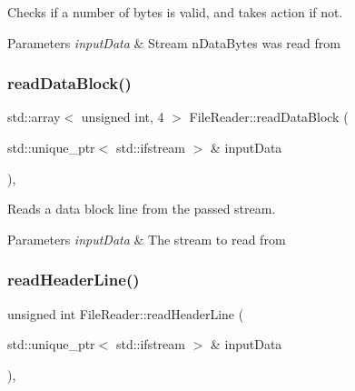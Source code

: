 Checks if a number of bytes is valid, and takes action if not. 


\begin{DoxyParams}{Parameters}
{\em input\+Data} & Stream n\+Data\+Bytes was read from \\
\hline
\end{DoxyParams}
\mbox{\label{class_file_reader_ac578b683eba751027766a2c30f03a28b}} 
\subsubsection{\texorpdfstring{read\+Data\+Block()}{readDataBlock()}}
{\footnotesize\ttfamily std\+::array$<$ unsigned int, 4 $>$ File\+Reader\+::read\+Data\+Block (\begin{DoxyParamCaption}\item[{std\+::unique\+\_\+ptr$<$ std\+::ifstream $>$ \&}]{input\+Data }\end{DoxyParamCaption})\hspace{0.3cm}{\ttfamily [inline]}, {\ttfamily [private]}}



Reads a data block line from the passed stream. 


\begin{DoxyParams}{Parameters}
{\em input\+Data} & The stream to read from \\
\hline
\end{DoxyParams}
\mbox{\label{class_file_reader_a94181d78b29ebacf2a4b3b3cd03a6750}} 
\subsubsection{\texorpdfstring{read\+Header\+Line()}{readHeaderLine()}}
{\footnotesize\ttfamily unsigned int File\+Reader\+::read\+Header\+Line (\begin{DoxyParamCaption}\item[{std\+::unique\+\_\+ptr$<$ std\+::ifstream $>$ \&}]{input\+Data }\end{DoxyParamCaption})\hspace{0.3cm}{\ttfamily [inline]}, {\ttfamily [private]}}



